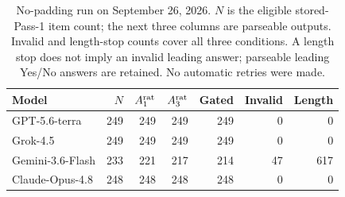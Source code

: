 \begin{table}[htbp]
\caption{No-padding run on September 26, 2026. $N$ is the eligible stored-Pass-1 item count; the next three columns are parseable outputs. Invalid and length-stop counts cover all three conditions. A length stop does not imply an invalid leading answer; parseable leading Yes/No answers are retained. No automatic retries were made.}
\label{tab:clean_retention}
\centering
\small
\setlength{\tabcolsep}{3.5pt}
\begin{tabular}{lrrrrrr}
\toprule
Model & $N$ & $A_1^{\rm rat}$ & $A_3^{\rm rat}$ & Gated & Invalid & Length \\
\midrule
GPT-5.6-terra & 249 & 249 & 249 & 249 & 0 & 0 \\
Grok-4.5 & 249 & 249 & 249 & 249 & 0 & 0 \\
Gemini-3.6-Flash & 233 & 221 & 217 & 214 & 47 & 617 \\
Claude-Opus-4.8 & 248 & 248 & 248 & 248 & 0 & 0 \\
\bottomrule
\end{tabular}
\end{table}
